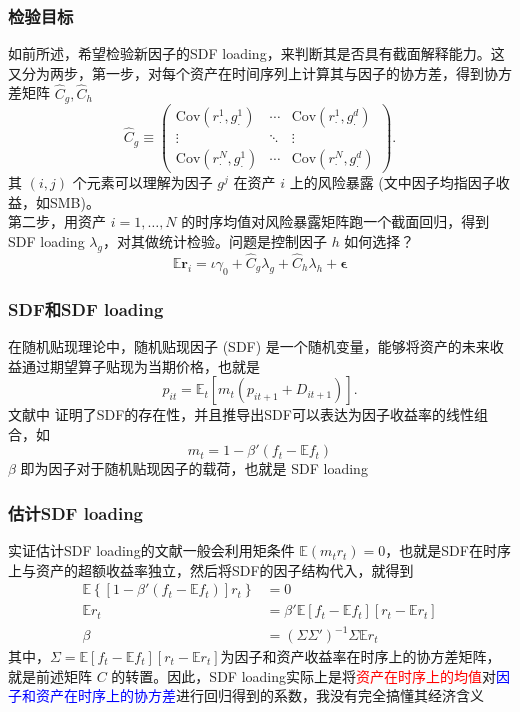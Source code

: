 \documentclass[
  UTF8,
  xcolor={dvipsnames,rgb},
  hyperref={colorlinks, citecolor=orange, linkcolor=black},
  aspectratio=169
  ]{beamer}
\begin{document}
\begin{frame}
    \frametitle{检验目标}
    如前所述，希望检验新因子的SDF loading，来判断其是否具有截面解释能力。这又分为两步，第一步，对每个资产在时间序列上计算其与因子的协方差，得到协方差矩阵 \(\hat{C}_g, \hat{C}_h\)
    \[
        \hat{C}_{g} \equiv  \begin{pmatrix}
        \mathrm{Cov}(r_{\cdot}^{1},g_{\cdot}^{1}) & \cdots & \mathrm{Cov}(r_{\cdot}^{1},g_{\cdot}^{d}) \\
        \vdots & \ddots & \vdots \\
        \mathrm{Cov}(r_{\cdot}^{N},g_{\cdot}^{1}) & \cdots & \mathrm{Cov}(r_{\cdot}^{N},g_{\cdot}^{d})
        \end{pmatrix}
    .\]
    其 \((i,j)\) 个元素可以理解为因子 \(g^{j}\) 在资产 \(i\) 上的风险暴露 (文中因子均指因子收益，如SMB)。
    \\
    \vspace{1em}
    第二步，用资产 \(i=1, \ldots ,N\) 的时序均值对风险暴露矩阵跑一个截面回归，得到SDF loading \(\lambda_g\)，对其做统计检验。问题是控制因子 \(h\) 如何选择？
    \[\mathbb{E} \boldsymbol{r}_{i} =\iota \gamma_{0}+\hat{C}_{g}\lambda_{g}+\hat{C}_{h}\lambda_{h}+\boldsymbol{\epsilon}\]
\end{frame}

\begin{frame}
    \frametitle{SDF和SDF loading}
    在随机贴现理论中，随机贴现因子 (SDF) 是一个随机变量，能够将资产的未来收益通过期望算子贴现为当期价格，也就是
    \[p_{it} = \mathbb{E}_t [m_t(p_{it+1}+D_{it+1})] .\]
    文献中 \parencite{Cochrane2009} 证明了SDF的存在性，并且推导出SDF可以表达为因子收益率的线性组合，如
    \[m_t=1-\beta'(f_t-\mathbb{E}f_t)\]
    \(\beta\) 即为因子对于随机贴现因子的载荷，也就是 SDF loading
\end{frame}

\begin{frame}
    \frametitle{估计SDF loading}
    实证估计SDF loading的文献一般会利用矩条件 \(\mathbb{E}(m_t r_t)=0\)，也就是SDF在时序上与资产的超额收益率独立，然后将SDF的因子结构代入，就得到
    \begin{align*}
        \mathbb{E} \left\{[1-\beta'(f_t-\mathbb{E}f_t)]r_t\right\}&=0 \\
        \mathbb{E}r_t &= \beta' \mathbb{E}[f_t-\mathbb{E}f_t][r_t-\mathbb{E}r_t] \\
        \beta &= (\Sigma \Sigma')^{-1} \Sigma \mathbb{E}r_t
    \end{align*}
    其中，\(\Sigma=\mathbb{E}[f_t-\mathbb{E}f_t][r_t-\mathbb{E}r_t]\)为因子和资产收益率在时序上的协方差矩阵，就是前述矩阵 \(C\) 的转置。因此，SDF loading实际上是将\textcolor{red}{资产在时序上的均值}对\textcolor{blue}{因子和资产在时序上的协方差}进行回归得到的系数，我没有完全搞懂其经济含义
\end{frame}
\end{document}
